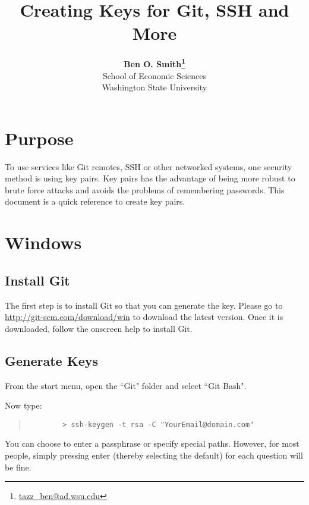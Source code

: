 \documentclass[11pt]{article}
\begin{document}
 

\title{Creating Keys for Git, SSH and More}
\date{}
\author{\textbf{Ben O. Smith\footnote{\href{mailto:tazz_ben@ad.wsu.edu}{tazz\_ben@ad.wsu.edu}}} \\
School of Economic Sciences \\
Washington State University}
\maketitle \doublespace

\section*{Purpose}

To use services like Git remotes, SSH or other networked systems, one security method is using key pairs.  Key pairs has the advantage of being more robust to brute force attacks and avoids the problems of remembering passwords.  This document is a quick reference to create key pairs.

\section{Windows}

\subsection{Install Git}

The first step is to install Git so that you can generate the key.  Please go to \href{http://git-scm.com/download/win}{http://git-scm.com/download/win} to download the latest version.  Once it is downloaded, follow the onscreen help to install Git.

\subsection{Generate Keys}

From the start menu, open the ``Git" folder and select ``Git Bash".
	
Now type:

\begin{quote}
	\begin{verbatim}
		> ssh-keygen -t rsa -C "YourEmail@domain.com"
	\end{verbatim}
\end{quote}

You can choose to enter a passphrase or specify special paths.  However, for most people, simply pressing enter (thereby selecting the default) for each question will be fine.
\end{document}
